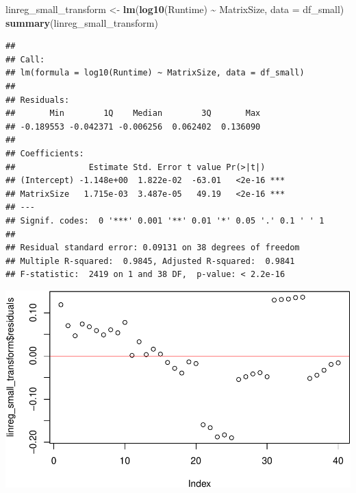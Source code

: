 \documentclass[
]{article}
\newenvironment{Shaded}{\begin{snugshade}}{\end{snugshade}}
\newcommand{\DataTypeTok}[1]{\textcolor[rgb]{0.13,0.29,0.53}{#1}}
\newcommand{\DecValTok}[1]{\textcolor[rgb]{0.00,0.00,0.81}{#1}}
\newcommand{\KeywordTok}[1]{\textcolor[rgb]{0.13,0.29,0.53}{\textbf{#1}}}
\newcommand{\NormalTok}[1]{#1}
\newcommand{\OperatorTok}[1]{\textcolor[rgb]{0.81,0.36,0.00}{\textbf{#1}}}
\newcommand{\StringTok}[1]{\textcolor[rgb]{0.31,0.60,0.02}{#1}}
\begin{document}
\begin{Shaded}
\begin{Highlighting}[]
\NormalTok{linreg\_small\_transform \textless{}{-}}\StringTok{ }\KeywordTok{lm}\NormalTok{(}\KeywordTok{log10}\NormalTok{(Runtime) }\OperatorTok{\textasciitilde{}}\StringTok{ }\NormalTok{MatrixSize, }\DataTypeTok{data =}\NormalTok{ df\_small)}
\KeywordTok{summary}\NormalTok{(linreg\_small\_transform)}
\end{Highlighting}
\end{Shaded}

\begin{verbatim}
## 
## Call:
## lm(formula = log10(Runtime) ~ MatrixSize, data = df_small)
## 
## Residuals:
##       Min        1Q    Median        3Q       Max 
## -0.189553 -0.042371 -0.006256  0.062402  0.136090 
## 
## Coefficients:
##               Estimate Std. Error t value Pr(>|t|)    
## (Intercept) -1.148e+00  1.822e-02  -63.01   <2e-16 ***
## MatrixSize   1.715e-03  3.487e-05   49.19   <2e-16 ***
## ---
## Signif. codes:  0 '***' 0.001 '**' 0.01 '*' 0.05 '.' 0.1 ' ' 1
## 
## Residual standard error: 0.09131 on 38 degrees of freedom
## Multiple R-squared:  0.9845, Adjusted R-squared:  0.9841 
## F-statistic:  2419 on 1 and 38 DF,  p-value: < 2.2e-16
\end{verbatim}

\begin{Shaded}
\end{Shaded}

\includegraphics{main_files/figure-latex/unnamed-chunk-15-3.pdf}
\end{document}
